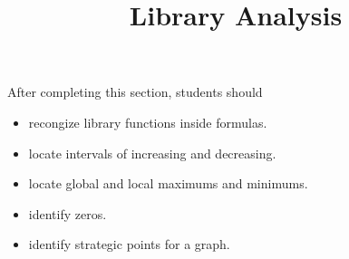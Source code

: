 \documentclass{ximera}
\title{Library Analysis}
\begin{document}
\begin{abstract}
\end{abstract}
\maketitle

\begin{sectionOutcomes}
After completing this section, students should 

\begin{itemize}
\item recongize library functions inside formulas.
\item locate intervals of increasing and decreasing.
\item locate global and local maximums and minimums.
\item identify zeros.
\item identify strategic points for a graph.
\end{itemize}
\end{sectionOutcomes}
\end{document}
